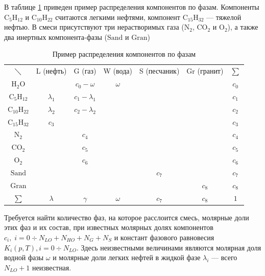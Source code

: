 \documentclass[12pt]{article}
\let\dividesymbol\div
\renewcommand{\div}{\operatorname{div}}
\begin{document}
В таблице \ref{t:compphases} приведен пример распределения компонентов по фазам. Компоненты $\mathrm{C_5H_{12}}$ и $\mathrm{C_{10}H_{22}}$ считаются легкими нефтями, компонент $\mathrm{C_{15}H_{32}}$ --- тяжелой нефтью. В смеси присутствуют три нерастворимых газа ($\mathrm{N_2}$, $\mathrm{CO_2}$ и $\mathrm{O_2}$), а также два инертных компонента-фазы ($\mathrm{Sand}$ и $\mathrm{Gran}$)

\begin{table}[ht!]
\centering
\begin{tabular}{c|c|c|c|c|c|c}
\multicolumn{1}{c}{$\diagdown$}& \multicolumn{1}{c}{L (нефть)}& \multicolumn{1}{c}{G (газ)}& \multicolumn{1}{c}{W
(вода)}& \multicolumn{1}{c}{S (песчаник)}& Gr (гранит)&
$\sum$\\
\cline{2-6}
$\mathrm{H_2O}$& & $c_0 - \omega$ & $\omega$ & & & $c_0$\\
\cline{1-6}
$\mathrm{C_5H_{12}}$& $\lambda_1$ & $c_1 - \lambda_1$ & & & & $c_1$\\
\cline{2-6}
$\mathrm{C_{10}H_{22}}$& $\lambda_2$ & $c_2 - \lambda_2$ & & & & $c_2$\\
\cline{1-6}
$\mathrm{C_{15}H_{32}}$& $c_3$ & & & & & $c_3$\\
\cline{1-6}
$\mathrm{N_2}$& & $c_4$ & & & & $c_4$\\
\cline{2-6}
$\mathrm{CO_2}$& & $c_5$ & & & & $c_5$\\
\cline{2-6}
$\mathrm{O_2}$& & $c_6$ & & & & $c_6$\\
\cline{1-6}
$\mathrm{Sand}$& & & & $c_7$ & & $c_7$\\
\cline{2-6}
$\mathrm{Gran}$& & & & & $c_8$ & $c_8$\\
\cline{1-6} \multicolumn{1}{c}{$\sum$}& \multicolumn{1}{c}{$\lambda$}& \multicolumn{1}{c}{$\gamma$}&
\multicolumn{1}{c}{$\omega$}& \multicolumn{1}{c}{$c_7$}& \multicolumn{1}{c}{$c_8$}&
\multicolumn{1}{c}{$1$}\\
\end{tabular}
\caption{Пример распределения компонентов по фазам} \label{t:compphases}
\end{table}

Требуется найти количество фаз, на которое расслоится смесь, молярные доли этих фаз и их состав, при известных молярных долях компонентов $c_i, \; i = 0 \dividesymbol N_{LO} + N_{HO} + N_{G} + N_{S}$ и констант фазового равновесия $K_i (p, T), i = 0 \dividesymbol N_{LO} $. Здесь неизвестными величинами являются молярная доля водной фазы $ \omega $ и молярные доли легких нефтей в жидкой фазе $ \lambda_i $ --- всего $N_{LO} + 1$ неизвестная.
\end{document}
